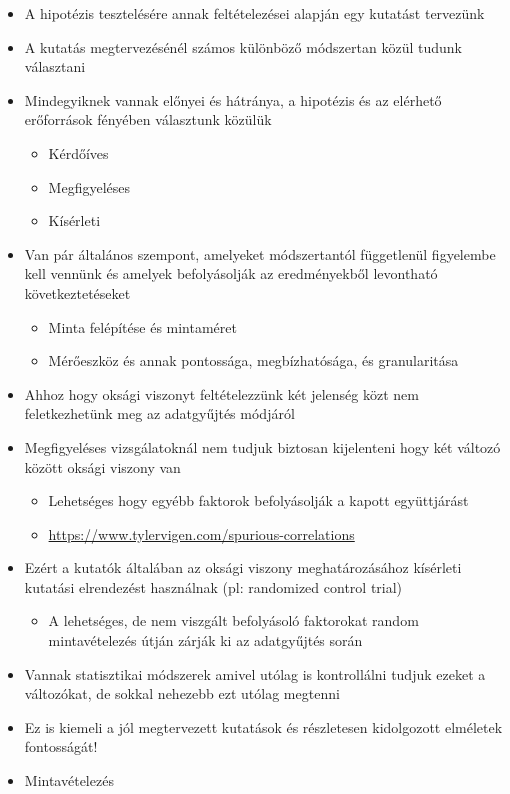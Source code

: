 \documentclass[
  letterpaper,
  DIV=11,
  numbers=noendperiod]{scrreprt}
\providecommand{\tightlist}{%
  \setlength{\itemsep}{0pt}\setlength{\parskip}{0pt}}\usepackage{longtable,booktabs,array}
\begin{document}
\begin{enumerate}
  \begin{itemize}
  \item
    A hipotézis tesztelésére annak feltételezései alapján egy kutatást
    tervezünk
  \item
    A kutatás megtervezésénél számos különböző módszertan közül tudunk
    választani
  \item
    Mindegyiknek vannak előnyei és hátránya, a hipotézis és az elérhető
    erőforrások fényében választunk közülük

    \begin{itemize}
    \item
      Kérdőíves
    \item
      Megfigyeléses
    \item
      Kísérleti
    \end{itemize}
  \item
    Van pár általános szempont, amelyeket módszertantól függetlenül
    figyelembe kell vennünk és amelyek befolyásolják az eredményekből
    levontható következtetéseket

    \begin{itemize}
    \item
      Minta felépítése és mintaméret
    \item
      Mérőeszköz és annak pontossága, megbízhatósága, és granularitása
    \end{itemize}
  \item
    Ahhoz hogy oksági viszonyt feltételezzünk két jelenség közt nem
    feletkezhetünk meg az adatgyűjtés módjáról
  \item
    Megfigyeléses vizsgálatoknál nem tudjuk biztosan kijelenteni hogy
    két változó között oksági viszony van

    \begin{itemize}
    \item
      Lehetséges hogy egyébb faktorok befolyásolják a kapott
      együttjárást
    \item
      \url{https://www.tylervigen.com/spurious-correlations}
    \end{itemize}
  \item
    Ezért a kutatók általában az oksági viszony meghatározásához
    kísérleti kutatási elrendezést használnak (pl: randomized control
    trial)

    \begin{itemize}
    \tightlist
    \item
      A lehetséges, de nem viszgált befolyásoló faktorokat random
      mintavételezés útján zárják ki az adatgyűjtés során
    \end{itemize}
  \item
    Vannak statisztikai módszerek amivel utólag is kontrollálni tudjuk
    ezeket a változókat, de sokkal nehezebb ezt utólag megtenni
  \item
    Ez is kiemeli a jól megtervezett kutatások és részletesen
    kidolgozott elméletek fontosságát!
  \item
    Mintavételezés


\end{itemize}
\end{enumerate}
\end{document}
